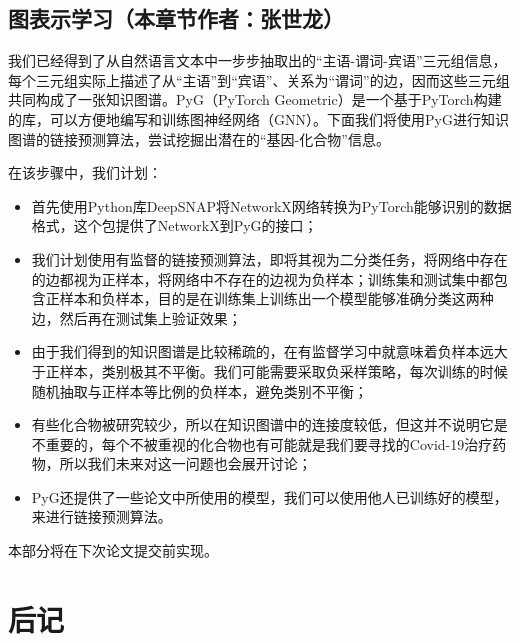 \documentclass[twocolumn]{article}
\begin{document}
\subsection{图表示学习（本章节作者：张世龙）\label{chap:embedding}}
我们已经得到了从自然语言文本中一步步抽取出的“主语-谓词-宾语”三元组信息，每个三元组实际上描述了从“主语”到“宾语”、关系为“谓词”的边，因而这些三元组共同构成了一张知识图谱。PyG（PyTorch Geometric）是一个基于PyTorch构建的库，可以方便地编写和训练图神经网络（GNN）。下面我们将使用PyG进行知识图谱的链接预测算法，尝试挖掘出潜在的“基因-化合物”信息。\par
在该步骤中，我们计划：\par
\begin{itemize}
	\item 首先使用Python库DeepSNAP将NetworkX网络转换为PyTorch能够识别的数据格式，这个包提供了NetworkX到PyG的接口；
	\item 我们计划使用有监督的链接预测算法，即将其视为二分类任务，将网络中存在的边都视为正样本，将网络中不存在的边视为负样本；训练集和测试集中都包含正样本和负样本，目的是在训练集上训练出一个模型能够准确分类这两种边，然后再在测试集上验证效果；
	\item 由于我们得到的知识图谱是比较稀疏的，在有监督学习中就意味着负样本远大于正样本，类别极其不平衡。我们可能需要采取负采样策略，每次训练的时候随机抽取与正样本等比例的负样本，避免类别不平衡；
	\item 有些化合物被研究较少，所以在知识图谱中的连接度较低，但这并不说明它是不重要的，每个不被重视的化合物也有可能就是我们要寻找的Covid-19治疗药物，所以我们未来对这一问题也会展开讨论；
	\item PyG还提供了一些论文中所使用的模型，我们可以使用他人已训练好的模型，来进行链接预测算法。
\end{itemize}\par
本部分将在下次论文提交前实现。


\section{后记}
\end{document}
